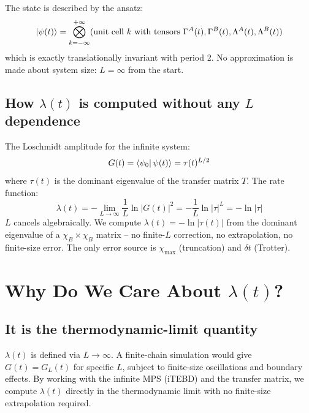 \documentclass[11pt, a4paper]{article}
\begin{document}
The state is described by the ansatz:
\begin{equation*}
  \ket{\psi(t)} = \bigotimes_{k=-\infty}^{+\infty} (\text{unit cell } k \text{ with tensors } \Gamma^A(t), \Gamma^B(t), \Lambda^A(t), \Lambda^B(t))
\end{equation*}
which is exactly translationally invariant with period 2. No approximation is made about system size: $L = \infty$ from the start.

\subsection{How $\lambda(t)$ is computed without any $L$ dependence}

The Loschmidt amplitude for the infinite system:
\begin{equation}
  G(t) = \bra{\psi_0}\psi(t)\rangle = \tau(t)^{L/2}
\end{equation}
where $\tau(t)$ is the dominant eigenvalue of the transfer matrix $T$. The rate function:
\begin{equation}
  \lambda(t) = -\lim_{L\to\infty}\frac{1}{L}\ln|G(t)|^2 = -\frac{1}{L}\ln|\tau|^L = -\ln|\tau|
\end{equation}
$L$ cancels algebraically. We compute $\lambda(t) = -\ln|\tau(t)|$ from the dominant eigenvalue of a $\chi_B \times \chi_B$ matrix -- no finite-$L$ correction, no extrapolation, no finite-size error. The only error source is $\chi_{\max}$ (truncation) and $\delta t$ (Trotter).

\section{Why Do We Care About $\lambda(t)$?}
\label{sec:why_lambda}

\subsection{It is the thermodynamic-limit quantity}

$\lambda(t)$ is defined via $L \to \infty$. A finite-chain simulation would give $G(t) = G_L(t)$ for specific $L$, subject to finite-size oscillations and boundary effects. By working with the infinite MPS (iTEBD) and the transfer matrix, we compute $\lambda(t)$ directly in the thermodynamic limit with no finite-size extrapolation required.
\end{document}
